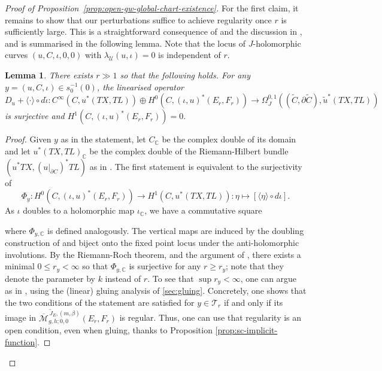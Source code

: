 \documentclass[11pt,psamsfonts, oneside, reqno]{amsart}
\newcommand{\g}{\circ}%
\newcommand{\inv}{^{-1}}
\newcommand{\cl}{\colon}
\newcommand{\lspan}[1]{\langle {#1}\rangle}
\newcommand{\Mbar}{\overline{\mathcal M}}
\newcommand{\del}{\partial}
\newcommand{\bC}{\mathbb{C}}
\newcommand{\cT}{\mathcal{T}}
\newcommand{\cU}{\mathcal{U}}
\newcommand{\wt}{\widetilde}
\newcommand{\obs}{s}
\newtheorem{lemma}[theorem]{Lemma}
\theoremstyle{definition}
\theoremstyle{remark}
\numberwithin{equation}{section}
\begin{document}
\begin{proof}[Proof of Proposition~\ref{prop:open-gw-global-chart-existence}]
	For the first claim, it remains to show that our perturbations suffice to achieve regularity once $r$ is sufficiently large. This is a straightforward consequence of \cite[Lemma 3.18]{HS22} and the discussion in \cite[]{KL06}, and is summarised in the following lemma. Note that the locus of $J$-holomorphic curves $(u,C,\iota,0,0)$ with $\lambda_\cU(u,\iota) = 0$ is independent of $r$.
	
	\begin{lemma}\label{prop:transversality-achieved} There exists $r \gg 1$ so that the following holds. For any $y = (u,C,\iota) \in \obs_0\inv(0)$, the linearised operator 
		$$D_u +\lspan{\cdot}\g d\tilde{\iota} \cl C^\infty(C,u^*(TX,TL)) \oplus H^0(C,(\iota,u)^*(E_r,F_r))\to \Omega^{0,1}_J((\wt C,\del \wt C),\wt u^*(TX,TL))$$\noindent
		is surjective and $H^1(C,(\iota,u)^*(E_r,F_r)) = 0.$
	\end{lemma}
	
	\begin{proof} Given $y$ as in the statement, let $C_\bC$ be the complex double of its domain and let $u^*(TX,TL)_\bC$ be the complex double of the Riemann-Hilbert bundle $(u^*TX,(u|_{\del C})^*TL)$ as in \cite[Theorem~3.3.13]{KL06}. The first statement is equivalent to the surjectivity of $$\Phi_y\cl H^0(C,(\iota,u)^*(E_r,F_r))\to H^1(C,u^*(TX,TL)) : \eta \mapsto [\lspan{\eta}\g d\iota].$$\noindent
		As $\iota$ doubles to a holomorphic map $\iota_\bC$, we have a commutative square 
		\begin{center} \end{center}
		where $\Phi_{y,\bC}$ is defined analogously. The vertical maps are induced by the doubling construction of \cite[Theorem~3.3.13]{KL06} and biject onto the fixed point locus under the anti-holomorphic involutions. By the Riemann-Roch theorem, \cite[Theorem~C.1.1]{MS12} and the argument of \cite[Proposition~6.26]{AMS21}, there exists a minimal $0 \leq r_y< \infty$ so that $\Phi_{y,\bC}$ is surjective for any $r\geq r_y$; note that they denote the parameter by $k$ instead of $r$. To see that $\sup r_y <\infty$, one can argue as in \cite[]{HS22}, using the (linear) gluing analysis of \textsection\ref{sec:gluing}. Concretely, one shows that the two conditions of the statement are satisfied for $y \in \cT_r$ if and only if its image in $\Mbar_{g,h;0,0}^{\,\wt J_E,(m,\beta)}(E_r,F_r)$ is regular. Thus, one can use that regularity is an open condition, even when gluing, thanks to Proposition \ref{prop:sc-implicit-function}.
	\end{proof}


\end{proof}
\end{document}
